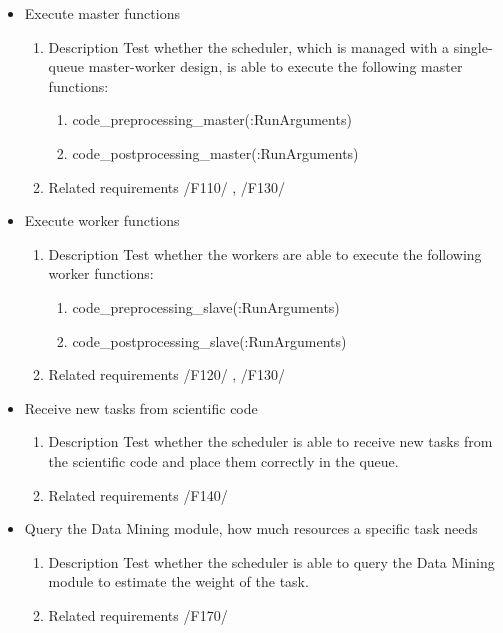 {\begin{itemize}
				\item Execute master functions
				\begin{enumerate}
						\item Description\newline
Test whether the scheduler, which is managed with a single-queue master-worker design, is able to execute the following master functions: 
					\begin{enumerate}
\item code\_preprocessing\_master(:RunArguments)
						\item code\_postprocessing\_master(:RunArguments)
					\end{enumerate}
						\item Related requirements\newline
 							  /F110/	, /F130/	
				\end{enumerate}
				
				
				
				\item Execute worker functions
				\begin{enumerate}
						\item Description\newline
Test whether the workers are able to execute the following worker functions: 
					\begin{enumerate}
						\item code\_preprocessing\_slave(:RunArguments)
						\item code\_postprocessing\_slave(:RunArguments)
					\end{enumerate}
						\item Related requirements\newline
 							  /F120/	, /F130/
				\end{enumerate}
				
				
				\item Receive new tasks from scientific code
				\begin{enumerate}
					\item Description\newline
Test whether the scheduler is able to receive new tasks from the scientific code and place them correctly in the queue.
					\item Related requirements\newline
						/F140/
				\end{enumerate}
				
				
				
				\item Query the Data Mining module, how much resources a specific task needs
				\begin{enumerate}
					\item Description\newline
Test whether the scheduler is able to query the Data Mining module to estimate the weight of the task.
					\item Related requirements\newline
						/F170/
				\end{enumerate}
				

\end{itemize}}
